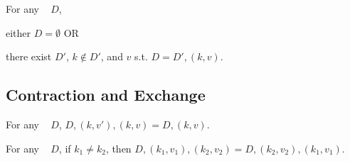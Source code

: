 \begin{theorem}[\EzDstr]
\label{thm:EzDstr}

\breakAndIndent
%
For any \dd~ $D$,

\justIndent \quad
%
either $D = \emptyset$ OR

\justIndent \quad
%
there exist $D'$, $k \notin D'$, and $v$
%
s.t. $D = D' , (k, v)$.

\end{theorem}

\subsection{Contraction and Exchange}


\begin{theorem}
\label{thm:cont-dicts}

\breakAndIndent
%
For any {\dd}~ $D$,
%
$D, (k, v'), (k, v) = D, (k, v)$.

\end{theorem}

\begin{theorem}
\label{thm:exch-dicts}

\breakAndIndent
%
For any {\dd}~ $D$,
%
if $k_1 \ne k_2$, then
%
$D, (k_1, v_1), (k_2, v_2) = D, (k_2, v_2), (k_1, v_1)$.

\end{theorem}
